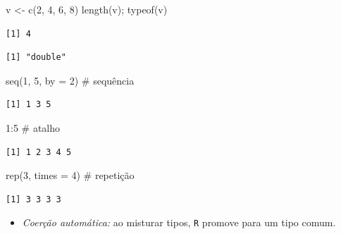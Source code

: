 \documentclass[
  letterpaper,
  DIV=11,
  numbers=noendperiod]{scrreprt}
\newenvironment{Shaded}{\begin{snugshade}}{\end{snugshade}}
\newcommand{\AttributeTok}[1]{\textcolor[rgb]{0.40,0.45,0.13}{#1}}
\newcommand{\CommentTok}[1]{\textcolor[rgb]{0.37,0.37,0.37}{#1}}
\newcommand{\DecValTok}[1]{\textcolor[rgb]{0.68,0.00,0.00}{#1}}
\newcommand{\FunctionTok}[1]{\textcolor[rgb]{0.28,0.35,0.67}{#1}}
\newcommand{\NormalTok}[1]{\textcolor[rgb]{0.00,0.23,0.31}{#1}}
\newcommand{\OtherTok}[1]{\textcolor[rgb]{0.00,0.23,0.31}{#1}}
\newcommand{\SpecialCharTok}[1]{\textcolor[rgb]{0.37,0.37,0.37}{#1}}
\providecommand{\tightlist}{%
  \setlength{\itemsep}{0pt}\setlength{\parskip}{0pt}}\usepackage{longtable,booktabs,array}
\begin{document}
\begin{Shaded}
\begin{Highlighting}[]
\NormalTok{v }\OtherTok{\textless{}{-}} \FunctionTok{c}\NormalTok{(}\DecValTok{2}\NormalTok{, }\DecValTok{4}\NormalTok{, }\DecValTok{6}\NormalTok{, }\DecValTok{8}\NormalTok{)}
\FunctionTok{length}\NormalTok{(v); }\FunctionTok{typeof}\NormalTok{(v)}
\end{Highlighting}
\end{Shaded}

\begin{verbatim}
[1] 4
\end{verbatim}

\begin{verbatim}
[1] "double"
\end{verbatim}

\begin{Shaded}
\begin{Highlighting}[]
\FunctionTok{seq}\NormalTok{(}\DecValTok{1}\NormalTok{, }\DecValTok{5}\NormalTok{, }\AttributeTok{by =} \DecValTok{2}\NormalTok{)      }\CommentTok{\# sequência}
\end{Highlighting}
\end{Shaded}

\begin{verbatim}
[1] 1 3 5
\end{verbatim}

\begin{Shaded}
\begin{Highlighting}[]
\DecValTok{1}\SpecialCharTok{:}\DecValTok{5}                    \CommentTok{\# atalho}
\end{Highlighting}
\end{Shaded}

\begin{verbatim}
[1] 1 2 3 4 5
\end{verbatim}

\begin{Shaded}
\begin{Highlighting}[]
\FunctionTok{rep}\NormalTok{(}\DecValTok{3}\NormalTok{, }\AttributeTok{times =} \DecValTok{4}\NormalTok{)      }\CommentTok{\# repetição}
\end{Highlighting}
\end{Shaded}

\begin{verbatim}
[1] 3 3 3 3
\end{verbatim}

\begin{itemize}
\tightlist
\item
  \emph{Coerção automática:} ao misturar tipos, \texttt{R} promove para
  um tipo comum.
\end{itemize}
\end{document}
